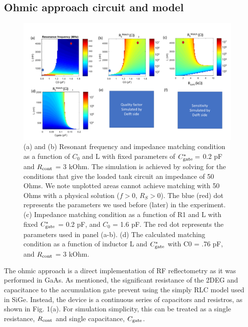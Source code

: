 \documentclass[twocolumn]{article}
\begin{document}
\subsection{Ohmic approach circuit and model} %


\begin{figure}
	\includegraphics[width = \textwidth]{Illustrations/HarvardFigure2_v5.pdf}		
	\caption{(a) and (b) Resonant frequency and impedance matching condition as a function of $C_0$ and L with fixed parameters of $C^*_{\rm gate} =$ 0.2 pF and $R_{\rm cont}$ = 3 kOhm. The simulation is achieved by solving for the conditions that give the loaded tank circuit an impedance of 50 Ohms. We note unplotted areas cannot achieve matching with 50 Ohms with a physical solution ($f>0$, $R_S>0$). The blue (red) dot represents the parameters we used before (later) in the experiment. 
		(c) Impedance matching condition as a function of R1 and L with fixed $C^*_{\rm gate}$ = 0.2 pF, and $C_0$ = 1.6 pF. The red dot represents the parameters used in panel (a-b). 
		(d) The calculated matching condition as a function of inductor L and  $C^*_{\rm gate}$ with C0 = .76 pF, and $R_{\rm cont}$ = 3 kOhm. }
	\label{fig:HarvardTheory}
\end{figure}



	\label{sub:ohmic_approach_circuit_and_model}
	
	The ohmic approach is a direct implementation of RF reflectometry as it was performed in GaAs.  As mentioned, the significant resistance of the 2DEG and capacitance to the accumulation gate prevent using the simply RLC model used in SiGe.  Instead, the device is a continuous series of capacitors and resistros, as shown in Fig. 1(a).  For simulation simplicity, this can be treated as a single resistance, $R_{\rm cont}$ and single capacitance, $C_{\rm gate}$.
	
\end{document}

